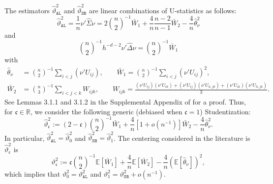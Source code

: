 \documentclass[11pt]{article}
\numberwithin{equation}{section}
\theoremstyle{definition}
\newcommand{\E}{\mathbb{E}}
\newcommand{\Scale}{\vartheta}
\begin{document}
The estimators $\widehat{\Scale}_\mathtt{AL}^2$ and $\widehat{\Scale}_\mathtt{SB}^2$ are linear combinations of U-statistics as follows:
\begin{equation*}
    \widehat{\Scale}_\mathtt{AL}^2 = \frac{1}{n} \nu'\widehat{\Sigma}\nu
    = 2\binom{n}{2}^{-1} \bar{W}_1 + \frac{4}{n}\frac{n-2}{n-1} \bar{W}_2 - \frac{4}{n}\widehat{\theta}_\nu^2
\end{equation*}
and
\begin{equation*}
    \binom{n}{2}^{-1}h^{-d-2}\nu'\widehat{\Delta}\nu = \binom{n}{2}^{-1}\bar{W}_1
\end{equation*}
with
\begin{align*}
    \widehat{\theta}_\nu &= \binom{n}{2}^{-1}\sum_{i<j} (\nu'U_{ij}),\qquad 
    \bar{W}_1 = \binom{n}{2}^{-1}\sum_{i<j} (\nu'U_{ij})^2,\\
    \bar{W}_2 &= \binom{n}{3}^{-1}\sum_{i<j<k} W_{ijk}, \qquad W_{ijk} = \frac{(\nu'U_{ij})(\nu'U_{ik})+(\nu'U_{ij})(\nu'U_{h,jk})+(\nu'U_{ik})(\nu'U_{h,jk})}{3}.
\end{align*}
See Lemmas 3.1.1 and 3.1.2 in the Supplemental Appendix of \citet{Cattaneo-Crump-Jansson_2014b_ET} for a proof. Thus, for $\mathfrak{c}\in\mathbb{R}$, we consider the following generic (debiased when $\mathfrak{c}=1$) Studentization:
\begin{equation*}
    \widehat{\Scale}_\mathfrak{c}^2 := (2-\mathfrak{c}) \binom{n}{2}^{-1} \bar{W}_1 + \frac{4}{n} [1+o(n^{-1})] \bar{W}_2 - \frac{4}{n} \widehat{\theta}_\nu^2.
\end{equation*}
In particular, $\widehat{\Scale}_\mathtt{AL}^2=\widehat{\Scale}_0^2$ and $\widehat{\Scale}_\mathtt{SB}^2=\widehat{\Scale}_1^2$. The centering considered in the literature is $\widehat{\Scale}_\mathfrak{c}^2$ is
\begin{equation*}
    \Scale_\mathfrak{c}^2 := \mathfrak{c} \binom{n}{2}^{-1} \E[\bar{W}_1] + \frac{4}{n} \E[\bar{W}_2] - \frac{4}{n} (\E[\widehat{\theta}_\nu])^2,
\end{equation*}
which implies that $\Scale_0^2 = \Scale_\mathtt{AL}^2$ and $\Scale_1^2 = \Scale_\mathtt{SB}^2 + o(n^{-1})$.
\end{document}
